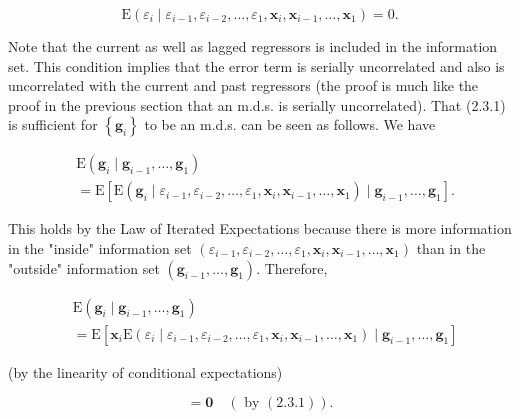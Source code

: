 \documentclass[10pt]{article}
\begin{document}
\begin{equation*}
\mathrm{E}\left(\varepsilon_{i} \mid \varepsilon_{i-1}, \varepsilon_{i-2}, \ldots, \varepsilon_{1}, \mathbf{x}_{i}, \mathbf{x}_{i-1}, \ldots, \mathbf{x}_{1}\right)=0 . \tag{2.3.1}
\end{equation*}


Note that the current as well as lagged regressors is included in the information\\
set. This condition implies that the error term is serially uncorrelated and also is uncorrelated with the current and past regressors (the proof is much like the proof in the previous section that an m.d.s. is serially uncorrelated). That (2.3.1) is sufficient for $\left\{\mathbf{g}_{i}\right\}$ to be an m.d.s. can be seen as follows. We have

$$
\begin{aligned}
& \mathrm{E}\left(\mathbf{g}_{i} \mid \mathbf{g}_{i-1}, \ldots, \mathbf{g}_{1}\right) \\
& =\mathrm{E}\left[\mathrm{E}\left(\mathbf{g}_{i} \mid \varepsilon_{i-1}, \varepsilon_{i-2}, \ldots, \varepsilon_{1}, \mathbf{x}_{i}, \mathbf{x}_{i-1}, \ldots, \mathbf{x}_{1}\right) \mid \mathbf{g}_{i-1}, \ldots, \mathbf{g}_{1}\right] .
\end{aligned}
$$

This holds by the Law of Iterated Expectations because there is more information in the "inside" information set $\left(\varepsilon_{i-1}, \varepsilon_{i-2}, \ldots, \varepsilon_{1}, \mathbf{x}_{i}, \mathbf{x}_{i-1}, \ldots, \mathbf{x}_{1}\right)$ than in the "outside" information set $\left(\mathbf{g}_{i-1}, \ldots, \mathbf{g}_{1}\right)$. Therefore,

$$
\begin{aligned}
& \mathrm{E}\left(\mathbf{g}_{i} \mid \mathbf{g}_{i-1}, \ldots, \mathbf{g}_{1}\right) \\
& =\mathrm{E}\left[\mathbf{x}_{i} \mathrm{E}\left(\varepsilon_{i} \mid \varepsilon_{i-1}, \varepsilon_{i-2}, \ldots, \varepsilon_{1}, \mathbf{x}_{i}, \mathbf{x}_{i-1}, \ldots, \mathbf{x}_{1}\right) \mid \mathbf{g}_{i-1}, \ldots, \mathbf{g}_{1}\right]
\end{aligned}
$$

(by the linearity of conditional expectations)


\begin{equation*}
=\mathbf{0} \quad(\text { by }(2.3 .1)) . \tag{2.3.2}
\end{equation*}
\end{document}
